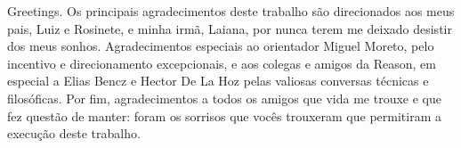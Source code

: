 


\begin{agradecimentos}

\lang
{
    Greetings.
}
{
Os principais agradecimentos deste trabalho são direcionados aos meus pais, Luiz e Rosinete, e minha irmã, Laiana, por nunca terem me deixado desistir dos meus sonhos. Agradecimentos especiais ao orientador Miguel Moreto, pelo incentivo e direcionamento excepcionais, e aos colegas e amigos da Reason, em especial a Elias Bencz e Hector De La Hoz pelas valiosas conversas técnicas e filosóficas. Por fim, agradecimentos a todos os amigos que vida me trouxe e que fez questão de manter: foram os sorrisos que vocês trouxeram que permitiram a execução deste trabalho.
}

\end{agradecimentos}


%
%
%
